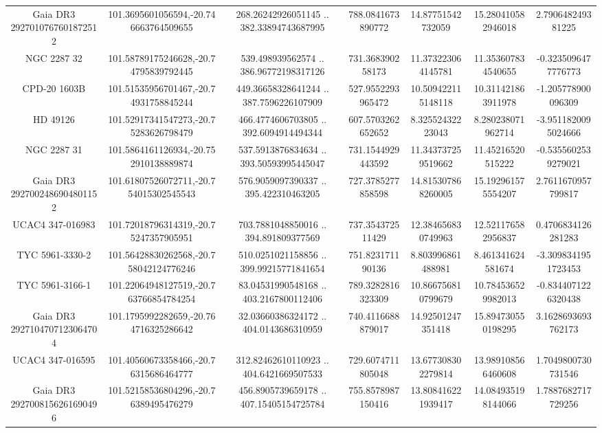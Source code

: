 \begin{table}
\begin{tabular}{ccccccc}
Gaia DR3 2927010767601872512 & 101.3695601056594,-20.746663764509655 & 268.26242926051145 .. 382.33894743687995 & 788.0841673890772 & 14.87751542732059 & 15.280410582946018 & 2.790648249381225 \\
NGC  2287    32 & 101.58789175246628,-20.74795839792445 & 539.498939562574 .. 386.96772198317126 & 731.368390258173 & 11.373223064145781 & 11.353607834540655 & -0.3235096477776773 \\
CPD-20  1603B & 101.51535956701467,-20.74931758845244 & 449.36658328641244 .. 387.7596226107909 & 527.9552293965472 & 10.509422115148118 & 10.311421863911978 & -1.205778900096309 \\
HD  49126 & 101.52917341547273,-20.75283626798479 & 466.4774606703805 .. 392.6094914494344 & 607.5703262652652 & 8.32552432223043 & 8.280238071962714 & -3.9511820095024666 \\
NGC  2287    31 & 101.5864161126934,-20.752910138889874 & 537.5913876834634 .. 393.50593995445047 & 731.1544929443592 & 11.343737259519662 & 11.45216520515222 & -0.5355602539279021 \\
Gaia DR3 2927002486904801152 & 101.61807526072711,-20.754015302545543 & 576.9059097390337 .. 395.422310463205 & 727.3785277858598 & 14.815307868260005 & 15.192961575554207 & 2.7611670957799817 \\
UCAC4 347-016983 & 101.72018796314319,-20.75247357905951 & 703.7881048850016 .. 394.891809377569 & 737.354372511429 & 12.384656830749963 & 12.521176582956837 & 0.4706834126281283 \\
TYC 5961-3330-2 & 101.56428830262568,-20.758042124776246 & 510.0251021158856 .. 399.99215771841654 & 751.823171190136 & 8.803996861488981 & 8.461341624581674 & -3.3098341951723453 \\
TYC 5961-3166-1 & 101.22064948127519,-20.763766854784254 & 83.04531990548168 .. 403.2167800112406 & 789.3282816323309 & 10.866756810799679 & 10.784536529982013 & -0.8344071226320438 \\
Gaia DR3 2927104707123064704 & 101.1795992282659,-20.764716325286642 & 32.03660386324172 .. 404.0143686310959 & 740.4116688879017 & 14.92501247351418 & 15.894730550198295 & 3.1628693693762173 \\
UCAC4 347-016595 & 101.40560673358466,-20.76315686464777 & 312.82462610110923 .. 404.6421669507533 & 729.6074711805048 & 13.677308302279814 & 13.989108566460608 & 1.7049800730731546 \\
Gaia DR3 2927008156261690496 & 101.52158536804296,-20.76389495476279 & 456.8905739659178 .. 407.15405154725784 & 755.8578987150416 & 13.808416221939417 & 14.084935198144066 & 1.7887682717729256 \\

\end{tabular}
\end{table}
